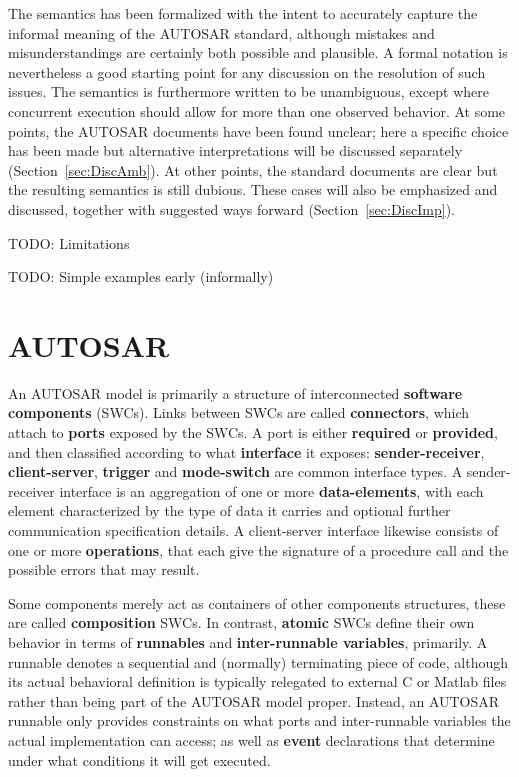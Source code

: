 \documentclass[twocolumn]{article}
\begin{document}
The semantics has been formalized with the intent to accurately capture the informal meaning of the AUTOSAR standard, although mistakes and misunderstandings are certainly both possible and plausible. A formal notation is nevertheless a good starting point for any discussion on the resolution of such issues. The semantics is furthermore written to be unambiguous, except where concurrent execution should allow for more than one observed behavior. At some points, the AUTOSAR documents have been found unclear; here a specific choice has been made but alternative interpretations will be discussed separately (Section~\ref{sec:DiscAmb}). At other points, the standard documents are clear but the resulting semantics is still dubious. These cases will also be emphasized and discussed, together with suggested ways forward (Section~\ref{sec:DiscImp}).


TODO: Limitations

TODO: Simple examples early (informally)

\section{AUTOSAR}
\label{sec:autosar}

An AUTOSAR model is primarily a structure of interconnected \textbf{software components} (SWCs). Links between SWCs are called \textbf{connectors}, which attach to \textbf{ports} exposed by the SWCs. A port is either \textbf{required} or \textbf{provided}, and then classified according to what \textbf{interface} it exposes: \textbf{sender-receiver}, \textbf{client-server}, \textbf{trigger} and \textbf{mode-switch} are common interface types. A sender-receiver interface is an aggregation of one or more \textbf{data-elements}, with each element characterized by the type of data it carries and optional further communication specification details. A client-server interface likewise consists of one or more \textbf{operations}, that each give the signature of a procedure call and the possible errors that may result.

Some components merely act as containers of other components structures, these are called \textbf{composition} SWCs. In contrast, \textbf{atomic} SWCs define their own behavior in terms of \textbf{runnables} and \textbf{inter-runnable variables}, primarily. A runnable denotes a sequential and (normally) terminating piece of code, although its actual behavioral definition is typically relegated to external C or Matlab files rather than being part of the AUTOSAR model proper. Instead, an AUTOSAR runnable  only provides constraints on what ports and inter-runnable variables the actual implementation can access; as well as \textbf{event} declarations that determine under what conditions it will get executed.
\end{document}
